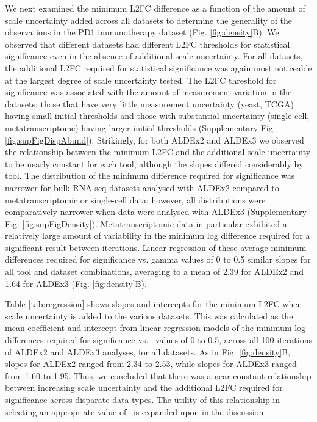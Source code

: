 \documentclass{article}
\begin{document}
We next examined the minimum L2FC difference as a function of the amount of scale uncertainty added across all datasets to determine the generality of the observations in the PD1 immunotherapy dataset (Fig. \ref{fig:density}B). We observed that different datasets had different L2FC thresholds for statistical significance even in the absence of additional scale uncertainty. For all datasets, the additional L2FC required for statistical significance was again most noticeable at the largest degree of scale uncertainty tested. The L2FC threshold for significance was associated with the amount of measurement variation in the datasets: those that have very little measurement uncertainty (yeast, TCGA) having small initial thresholds and those with substantial uncertainty (single-cell, metatranscriptome) having larger initial thresholds (Supplementary Fig. \ref{fig:supFigDispAbund}). Strikingly, for both ALDEx2 and ALDEx3 we observed the relationship between the minimum L2FC and the additional scale uncertainty to be nearly constant for each tool, although the slopes differed considerably by tool. The distribution of the minimum difference required for significance was narrower for bulk RNA-seq datasets analysed with ALDEx2 compared to metatranscriptomic or single-cell data; however, all distributions were comparatively narrower when data were analysed with ALDEx3 (Supplementary Fig. \ref{fig:supFigDensity}). Metatranscriptomic data in particular exhibited a relatively large amount of variability in the minimum log difference required for a significant result between iterations. Linear regression of these average minimum differences required for significance vs. gamma values of 0 to 0.5 similar slopes for all tool and dataset combinations, averaging to a mean of 2.39 for ALDEx2 and 1.64 for ALDEx3 (Fig. \ref{fig:density}B).

Table \ref{tab:regression} shows slopes and intercepts for the minimum L2FC when scale uncertainty is added to the various datasets. This was calculated as the mean coefficient and intercept from linear regression models of the minimum log differences required for significance vs. \textgamma~values of 0 to 0.5, across all 100 iterations of ALDEx2 and ALDEx3 analyses, for all datasets. As in Fig. \ref{fig:density}B, slopes for ALDEx2 ranged from 2.34 to 2.53, while slopes for ALDEx3 ranged from 1.60 to 1.95. Thus, we concluded that there was a near-constant relationship between increasing scale uncertainty and the additional L2FC required for significance across disparate data types. The utility of this relationship in selecting an appropriate value of \textgamma~is expanded upon in the discussion.
\end{document}
